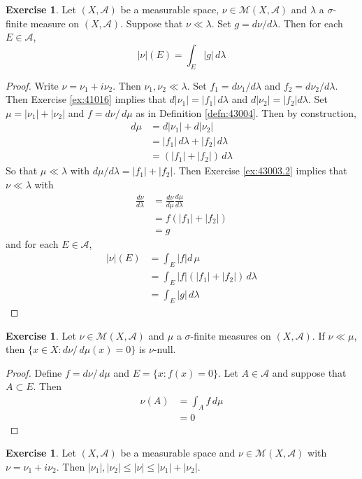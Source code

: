 \documentclass{book}
\theoremstyle{definition}
\newtheorem{ex}[definition]{Exercise}
\newcommand{\lam}{\lambda}
\newcommand{\sig}{\sigma}
\newcommand{\MA}{\mathcal{A}}
\newcommand{\MM}{\mathcal{M}}
\newcommand{\lex}[1]{\label{ex:#1}}
\newcommand{\rex}[1]{Exercise \ref{ex:#1}}
\newcommand{\rd}[1]{Definition \ref{defn:#1}}
\DeclareMathOperator*{\0}{\mbf{0}}
\DeclareMathOperator*{\1}{\mbf{1}}
\newcommand{\dmu}{\, d \mu}
\newcommand{\dlam}{\, d \lambda}
\begin{document}
	\begin{ex} \lex{43004.5} 
	Let $(X,\MA)$ be a measurable space, $\nu \in \MM(X,\MA)$ and $\lam$ a $\sig$-finite measure on $(X, \MA)$. Suppose that $\nu \ll \lam$. Set $g = d\nu / d\lam$. Then for each $E \in \MA$, $$|\nu|(E) = \int_E |g| \dlam$$
	\end{ex}
	
	\begin{proof}
	Write $\nu = \nu_1 + i \nu_2$. Then $\nu_1, \nu_2 \ll \lam$. Set $f_1 = d\nu_1 / d\lam$ and $f_2 = d\nu_2 / d\lam$. Then \rex{41016} implies that $d|\nu_1| = |f_1| \dlam$ and $d|\nu_2| = |f_2|d\lam$. Set $\mu = |\nu_1| + |\nu_2|$ and $f = d\nu / \dmu$ as in \rd{43004}. Then by construction, 
	\begin{align*}
	d\mu
	&= d|\nu_1| + d|\nu_2| \\
	&= |f_1| \dlam + |f_2| \dlam \\
	&= (|f_1| + |f_2|) \dlam
	\end{align*}
	So that $\mu \ll \lam$ with $d\mu / d \lam = |f_1| + |f_2|$. Then \rex{43003.2} implies that $\nu \ll \lam$ with 
	\begin{align*}
	\frac{d\nu}{d\lam} 
	&= \frac{d\nu}{d\mu} \frac{d\mu}{d\lam}\\
	&= f(|f_1|+|f_2|) \\
	&= g
	\end{align*}
	and for each $E \in \MA$, 
	\begin{align*}
	|\nu|(E) 
	&= \int_E |f| d \, \mu \\
	&= \int_E |f| (|f_1| + |f_2|) \, d\lam \\
	&= \int_E|g| \, d\lam 
	\end{align*}
	\end{proof}
	
	\begin{ex} \lex{43005} 
		Let $\nu \in \MM(X, \MA)$ and $\mu$ a $\sig$-finite measures on $(X,\MA)$. If $\nu \ll \mu$, then $\{x \in X: d\nu / \dmu(x) = 0 \}$ is $\nu$-null.
	\end{ex}
	
	\begin{proof}
		Define $f = d\nu / \dmu$ and $E = \{x: f(x) = 0\}$. Let $A \in \MA$ and suppose that $A \subset E$. Then 
		\begin{align*}
			\nu(A) 
			&= \int_A f \dmu\\
			&= 0
		\end{align*} 
	\end{proof}
	
	\begin{ex} \lex{43006} 
		Let $(X, \MA)$ be a measurable space and $\nu \in \MM(X, \MA)$ with $\nu = \nu_1 + i\nu_2$. Then $|\nu_1|, |\nu_2| \leq |\nu| \leq |\nu_1| + |\nu_2|$.
		
	\end{ex}
	
\end{document}
